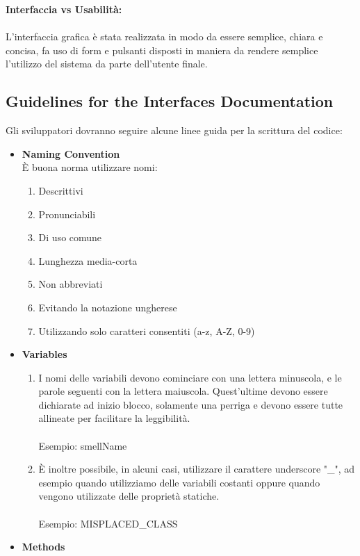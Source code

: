 \documentclass[11pt]{article}
\begin{document}
		\textbf{Interfaccia vs Usabilità:}\\\\
		L’interfaccia grafica è stata realizzata in modo da essere semplice, chiara e concisa, fa uso di
		form e pulsanti disposti in maniera da rendere semplice l’utilizzo del sistema da parte dell’utente
		finale.	
			
		\subsection{Guidelines for the Interfaces Documentation}
		Gli sviluppatori dovranno seguire alcune linee guida per la scrittura del codice:
		\begin{itemize}
		\item \textbf{Naming Convention}
		\newline \\	
		È buona norma utilizzare nomi:
			\begin{enumerate}
			\item Descrittivi
			\item Pronunciabili
			\item Di uso comune
			\item Lunghezza media-corta
			\item Non abbreviati
			\item Evitando la notazione ungherese
			\item Utilizzando solo caratteri consentiti (a-z, A-Z, 0-9)
			\end{enumerate}
		\item \textbf{Variables}
			\begin{enumerate}
				\item I nomi delle variabili devono cominciare con una lettera minuscola, e le parole seguenti con la lettera maiuscola. Quest'ultime devono essere dichiarate ad inizio blocco, solamente una perriga e devono essere tutte allineate per facilitare la leggibilità.\\\\
				Esempio: smellName\\
				\item È inoltre possibile, in alcuni casi, utilizzare il carattere underscore "\_", ad esempio quando utilizziamo delle variabili costanti oppure quando vengono utilizzate delle proprietà statiche.\\\\
				Esempio: MISPLACED\_CLASS
			\end{enumerate}
		\item \textbf{Methods}

\end{itemize}
\end{document}
